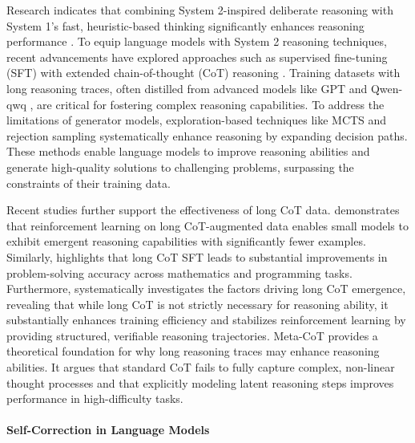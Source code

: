 Research indicates that combining System 2-inspired deliberate reasoning with System 1’s fast, heuristic-based thinking significantly enhances reasoning performance \cite{su2024dualformer}. 
To equip language models with System 2 reasoning techniques, recent advancements have explored approaches such as supervised fine-tuning (SFT) with extended chain-of-thought (CoT) reasoning \cite{bai2024longwriter,abdin2024phi,min2024imitate,huang2024o1,qin2024o1,wang2024enhancing,xu2024llava}. 
Training datasets with long reasoning traces, often distilled from advanced models like GPT \cite{li2024numinamath,luo2023wizardmath, yu2023metamath} and Qwen-qwq \cite{qwq-longcot}, are critical for fostering complex reasoning capabilities. 
To address the limitations of generator models, exploration-based techniques like MCTS \cite{guan2025rstar,zhang2024rest} and rejection sampling \cite{yuan2023scaling,brown2024large} systematically enhance reasoning by expanding decision paths. 
These methods enable language models to improve reasoning abilities and generate high-quality solutions to challenging problems, surpassing the constraints of their training data.

Recent studies further support the effectiveness of long CoT data. \cite{simplerl} demonstrates that reinforcement learning on long CoT-augmented data enables small models to exhibit emergent reasoning capabilities with significantly fewer examples. Similarly, \cite{open-r1} highlights that long CoT SFT leads to substantial improvements in problem-solving accuracy across mathematics and programming tasks. Furthermore, \cite{yeo2025demystifying} systematically investigates the factors driving long CoT emergence, revealing that while long CoT is not strictly necessary for reasoning ability, it substantially enhances training efficiency and stabilizes reinforcement learning by providing structured, verifiable reasoning trajectories. 
Meta-CoT \cite{xiang2025towards} provides a theoretical foundation for why long reasoning traces may enhance reasoning abilities. It argues that standard CoT fails to fully capture complex, non-linear thought processes and that explicitly modeling latent reasoning steps improves performance in high-difficulty tasks.



\paragraph{Self-Correction in Language Models}


